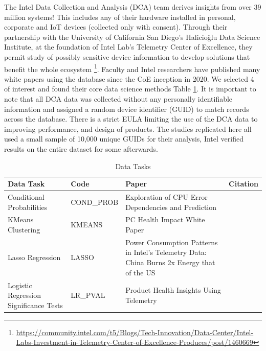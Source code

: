 \documentclass[12pt,letterpaper]{article}
\begin{document}
The Intel Data Collection and Analysis (DCA) team derives insights from over 39 million systems! This includes any of their hardware installed in personal, corporate and IoT devices (collected only with consent). Through their partnership with the University of California San Diego's Halicioğlu Data Science Institute, at the foundation of Intel Lab's Telemetry Center of Excellence, they permit study of possibly sensitive device information to develop solutions that benefit the whole ecosystem \footnote{\url{https://community.intel.com/t5/Blogs/Tech-Innovation/Data-Center/Intel-Labs-Investment-in-Telemetry-Center-of-Excellence-Produces/post/1460669}}. Faculty and Intel researchers have published many white papers using the database since the CoE inception in 2020. We selected 4 of interest and found their core data science methods Table \ref{tab:DataTasks}.
It is important to note that all DCA data was collected without any personally identifiable information and assigned a random device identifier (GUID) to match records across the database. There is a strict EULA limiting the use of the DCA data to improving performance, and design of products. The studies replicated here all used a small sample of 10,000 unique GUIDs for their analysis, Intel verified results on the entire dataset for some afterwards.

\begin{table}[h]%
\begin{center}
\caption{Data Tasks}
\label{tab:DataTasks}
\begin{tabular}{|p{4.5cm}|p{2.5cm}|p{5cm}|p{2.7cm}|}
    \hline
    Data Task & Code & Paper & Citation \\
    \hline
    Conditional Probabilities & COND\_PROB & Exploration of CPU Error Dependencies and Prediction & \cite{Kwasnick2023} \\
    \hline
    KMeans Clustering & KMEANS & PC Health Impact White Paper & \cite{kmeans} \\
    \hline
    Lasso Regression & LASSO & Power Consumption Patterns in Intel’s Telemetry Data: China Burns 2x Energy that of the US & \cite{lassocarbon} \\
    \hline
    Logistic Regression Significance Tests & LR\_PVAL & Product Health Insights Using Telemetry & \cite{prodhealLR} \\
    \hline
\end{tabular}
\end{center}
\end{table}
\end{document}

